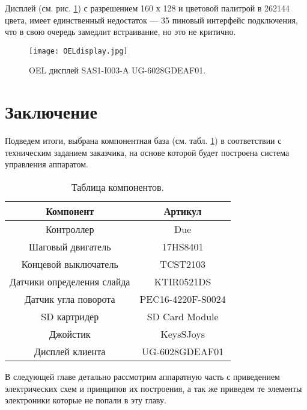 Дисплей (см. рис. \ref{fig:OELdisplay}) с разрешением 160 х 128 и цветовой палитрой в 262144 цвета, имеет единственный недостаток --- 35 пиновый интерфейс подключения, что в свою очередь замедлит встраивание, но это не критично.
\begin{figure}[ht]
	\centering
     \texttt{[image: OELdisplay.jpg]}
	\caption
	{
	OEL дисплей SAS1-I003-A UG-6028GDEAF01.
	}
	\label{fig:OELdisplay}
\end{figure}

\section{Заключение}
Подведем итоги, выбрана компонентная база (см. табл. \ref{tab:components}) в соответствии с техническим заданием заказчика, на основе которой будет построена система управления аппаратом.

\begin{table}[ht]
	\centering
\begin{tabular}{|c|c|}
\hline 
Компонент & Артикул \\ 
\hline 
Контроллер & Due \\ 
\hline 
Шаговый двигатель & 17HS8401 \\ 
\hline 
Концевой выключатель & TCST2103 \\ 
\hline 
Датчики определения слайда & KTIR0521DS \\ 
\hline 
Датчик угла поворота & PEC16-4220F-S0024 \\ 
\hline 
SD картридер & SD Card Module \\ 
\hline 
Джойстик &  KeysSJoys \\ 
\hline 
Дисплей клиента & UG-6028GDEAF01 \\ 
\hline 

\end{tabular} 
	\caption{Таблица компонентов.}
	\label{tab:components}
\end{table}

В следующей главе детально рассмотрим аппаратную часть с приведением электрических схем и принципов их построения, а так же приведем те элементы электроники которые не попали в эту главу.